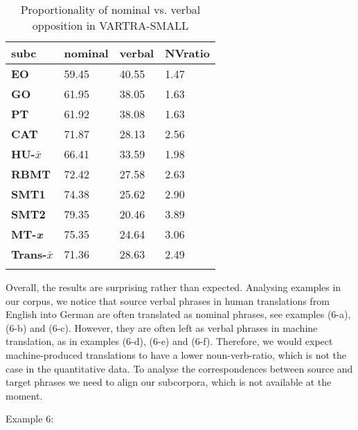\documentclass[output=paper]{LSP/langsci}
\begin{document}
\begin{table}
     \centering
     \begin{tabular}{llll}
\lsptoprule
\textbf{subc}    & \textbf{nominal}  & \textbf{verbal}  & \textbf{NVratio} \\ \midrule
\textbf{EO}    & 59.45   & 40.55  & 1.47 \\ \midrule
\textbf{GO}    & 61.95   & 38.05  & 1.63 \\ \midrule
\textbf{PT}    & 61.92	 & 38.08  & 1.63 \\
\textbf{CAT}   & 71.87   & 28.13  & 2.56  \\ \midrule
\textbf{HU-$\bar{x}$}   & 66.41  & 33.59   & 1.98\\ \midrule
\textbf{RBMT}  & 72.42   & 27.58  & 2.63 \\
\textbf{SMT1}  & 74.38	 & 25.62  & 2.90 \\
\textbf{SMT2}  & 79.35   & 20.46  & 3.89 \\ \midrule
\textbf{MT-\textit{x}}   & 75.35  & 24.64  & 3.06 \\ \midrule
\textbf{Trans-$\bar{x}$} & 71.36 & 28.63  & 2.49 \\ 
\lspbottomrule
     \end{tabular}

 \caption{Proportionality of nominal vs. verbal opposition in VARTRA-SMALL}
     \label{4.4}
\end{table}


Overall, the results are surprising rather than expected. Analysing examples in our corpus, we notice that source verbal phrases in human translations from English into German are often translated as nominal phrases, see examples (6-a), (6-b) and (6-c). However, they are often left as verbal phrases in machine translation, as in examples (6-d), (6-e) and (6-f). Therefore, we would expect machine-produced translations to have a lower noun-verb-ratio, which is not the case in the quantitative data.  To analyse the correspondences between source and target phrases we need to align our subcorpora, which is not available at the moment.

\noindent Example 6:
\end{document}
